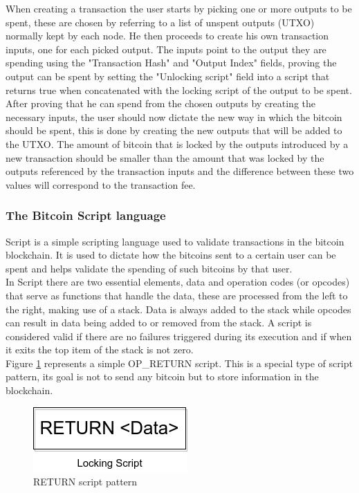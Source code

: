 When creating a transaction the user starts by picking one or more outputs to be spent, these are chosen by referring to a list of unspent outputs (UTXO) normally kept by each node. He then proceeds to create his own transaction inputs, one for each picked output. The inputs point to the output they are spending using the "Transaction Hash" and "Output Index" fields, proving the output can be spent by setting the "Unlocking script" field into a script that returns true when concatenated with the locking script of the output to be spent.
After proving that he can spend from the chosen outputs by creating the necessary inputs, the user should now dictate the new way in which the bitcoin should be spent, this is done by creating the new outputs that will be added to the UTXO. The amount of bitcoin that is locked by the outputs introduced by a new transaction should be smaller than the amount that was locked by the outputs referenced by the transaction inputs and the difference between these two values will correspond to the transaction fee. \\

\subsubsection{The Bitcoin Script language}
\label{sssec:bitcoin_script}

Script is a simple scripting language used to validate transactions in the bitcoin blockchain. It is used to dictate how the bitcoins sent to a certain user can be spent and helps validate the spending of such bitcoins by that user.\\
In Script there are two essential elements, data and operation codes (or opcodes) that serve as functions that handle the data, these are processed from the left to the right, making use of a stack. Data is always added to the stack while opcodes can result in data being added to or removed from the stack. A script is considered valid if there are no failures triggered during its execution and if when it exits the top item of the stack is not zero. \\
Figure \ref{fig:op_return} represents a simple OP\_RETURN script. This is a special type of script pattern, its goal is not to send any bitcoin but to store information in the blockchain.

\begin{figure}[H]
\begin{center}
  \includegraphics[width=0.3\linewidth]{images/op_return.png}
  \caption{RETURN script pattern}
  \label{fig:op_return}
  \end{center}
\end{figure}

